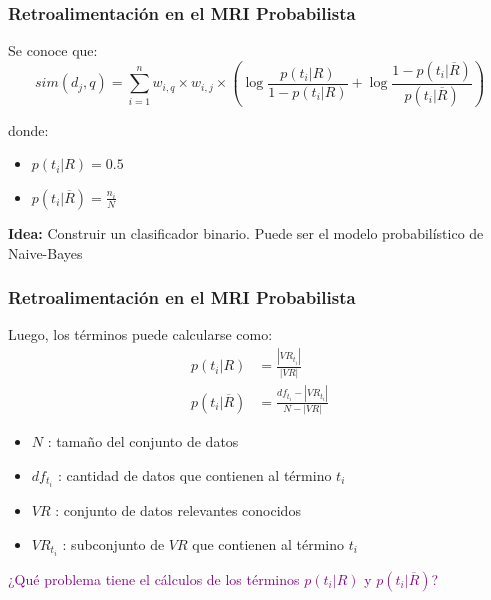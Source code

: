 \documentclass[
10pt, %
aspectratio=169, %
]{beamer}
\begin{document}
	\begin{frame}
		
		\frametitle{Retroalimentación en el MRI Probabilista}
		
		Se conoce que:
		$$sim(d_j, q) = \sum_{i = 1}^{n} w_{i, q} \times w_{i, j} \times (\log \frac{p(t_i|R)}{1 - p(t_i|R)} + \log \frac{1 - p(t_i|\overline{R})}{p(t_i|\overline{R})})$$
		
		donde:
		\begin{itemize}
			\item $p(t_i|R) = 0.5$
			\item $p(t_i|\overline{R}) = \frac{n_i}{N}$ \\[3mm]
		\end{itemize}
		
		\pause
		\vspace{2\baselineskip}
		\textbf{Idea: } Construir un clasificador binario. Puede ser el modelo probabilístico de Naive-Bayes \\[3mm]
		
	\end{frame}
	
	\begin{frame}
		
		\frametitle{Retroalimentación en el MRI Probabilista}
		
		Luego, los términos puede calcularse como:
		\begin{align*}
			p(t_i|R) &= \frac{|VR_{t_i}|}{|VR|} \\
			p(t_i|\overline{R}) &= \frac{df_{t_i} - |VR_{t_i}|}{N - |VR|}
		\end{align*}
		
		
		\begin{itemize}
			\item $N$ : tamaño del conjunto de datos
			\item $df_{t_i}$ : cantidad de datos que contienen al término $t_i$
			\item $VR$ : conjunto de datos relevantes conocidos
			\item $VR_{t_i}$ : subconjunto de $VR$ que contienen al término $t_i$ \\[3mm]
		\end{itemize}
		
		\pause
		\vspace{2\baselineskip}
		\textcolor{purple}{¿Qué problema tiene el cálculos de los términos $p(t_i|R)$ y $p(t_i|\overline{R})$?}	
		
		
	\end{frame}
	
\end{document}
